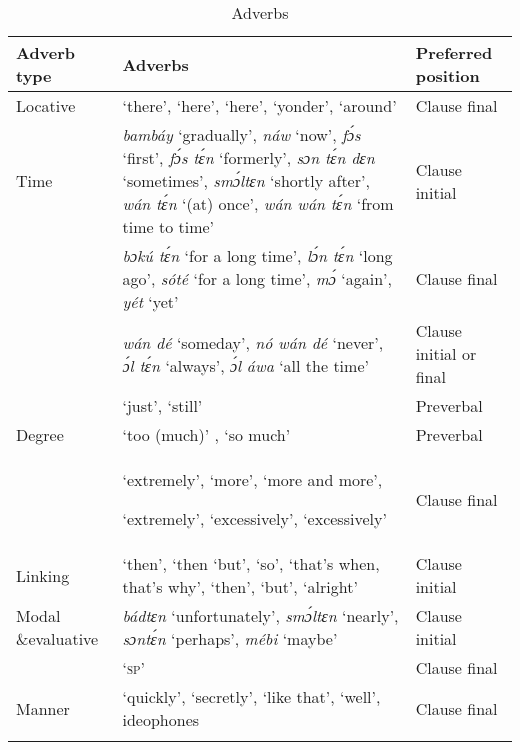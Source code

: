 \begin{table}
\caption{Adverbs}
\label{tab:key:7.12}

\begin{tabularx}{\textwidth}{p{16mm}Ql}
\lsptoprule
Adverb type & Adverbs & Preferred position\\
\midrule
Locative &  ‘there’,   ‘here’,  ‘here’,  ‘yonder’,  ‘around’ & Clause final\\
Time & \textit{bambáy} ‘gradually’, \textit{náw} ‘now’, \textit{fɔ́s} ‘first’, \textit{fɔ́s tɛ́n} ‘formerly’, \textit{sɔn tɛ́n dɛn} ‘sometimes’, \textit{smɔ́ltɛn} ‘shortly after’, \textit{wán tɛ́n} ‘(at) once’, \textit{wán wán tɛ́n} ‘from time to time’ & Clause initial\\
& \textit{bɔkú tɛ́n} ‘for a long time’, \textit{lɔ́n tɛ́n} ‘long ago’, \textit{sóté} ‘for a long time’, \textit{mɔ́} ‘again’, \textit{yét} ‘yet’ & Clause final\\
& \textit{wán dé} ‘someday’, \textit{nó wán dé} ‘never’, \textit{ɔ́l tɛ́n} ‘always’, \textit{ɔ́l áwa} ‘all the time’ & Clause initial or final\\
&  ‘just’,  ‘still’ & Preverbal\\
Degree &  ‘too (much)’ , ‘so much’ & Preverbal\\
& {  ‘extremely’,  ‘more’,  ‘more and more’,}

 ‘extremely’,  ‘excessively’,  ‘excessively’ & Clause final\\
Linking &  ‘then’,  ‘then ‘but’,  ‘so’,  ‘that’s when, that’s why’, ‘then’,  ‘but’,  ‘alright’ & Clause initial\\
Modal \&\newline  \mbox{evaluative} & \textit{bádtɛn} ‘unfortunately’, \textit{smɔ́ltɛn} ‘nearly’, \textit{sɔntɛ́n} ‘perhaps’, \textit{mébi} ‘maybe’ & Clause initial\\
&  ‘\textsc{sp}’ & Clause final\\
Manner &  ‘quickly’,  ‘secretly’,  ‘like that’,  ‘well’, ideophones & Clause final\\
\lspbottomrule
\end{tabularx}
\end{table}


